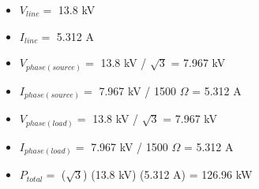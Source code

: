 





\begin{itemize}
\item{} $V_{line} =$ 13.8 kV
\item{} $I_{line} =$ 5.312 A
\item{} $V_{phase(source)} =$ 13.8 kV / $\sqrt{3}$ = 7.967 kV
\item{} $I_{phase(source)} =$ 7.967 kV / 1500 $\Omega$ = 5.312 A
\item{} $V_{phase(load)} =$ 13.8 kV / $\sqrt{3}$ = 7.967 kV
\item{} $I_{phase(load)} =$ 7.967 kV / 1500 $\Omega$ = 5.312 A
\item{} $P_{total} =$ ($\sqrt{3}$) (13.8 kV) (5.312 A) = 126.96 kW
\end{itemize}





